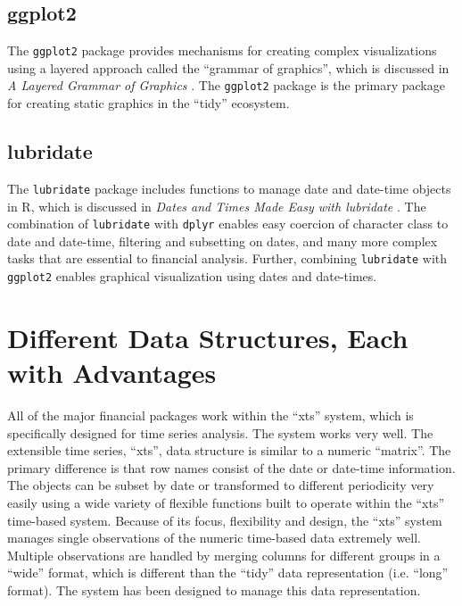 \subsection{ggplot2}\label{ggplot2}

The \texttt{ggplot2} package provides mechanisms for creating complex
visualizations using a layered approach called the ``grammar of
graphics'', which is discussed in \emph{A Layered Grammar of Graphics}
\citep{layered-grammar}. The \texttt{ggplot2} package is the primary
package for creating static graphics in the ``tidy'' ecosystem.

\subsection{lubridate}\label{lubridate}

The \texttt{lubridate} package includes functions to manage date and
date-time objects in R, which is discussed in \emph{Dates and Times Made
Easy with lubridate} \citep{lubridate}. The combination of
\texttt{lubridate} with \texttt{dplyr} enables easy coercion of
character class to date and date-time, filtering and subsetting on
dates, and many more complex tasks that are essential to financial
analysis. Further, combining \texttt{lubridate} with \texttt{ggplot2}
enables graphical visualization using dates and date-times.

\section{Different Data Structures, Each with
Advantages}\label{different-data-structures-each-with-advantages}

All of the major financial packages work within the ``xts'' system,
which is specifically designed for time series analysis. The system
works very well. The extensible time series, ``xts'', data structure is
similar to a numeric ``matrix''. The primary difference is that row
names consist of the date or date-time information. The objects can be
subset by date or transformed to different periodicity very easily using
a wide variety of flexible functions built to operate within the ``xts''
time-based system. Because of its focus, flexibility and design, the
``xts'' system manages single observations of the numeric time-based
data extremely well. Multiple observations are handled by merging
columns for different groups in a ``wide'' format, which is different
than the ``tidy'' data representation (i.e. ``long'' format). The system
has been designed to manage this data representation.

